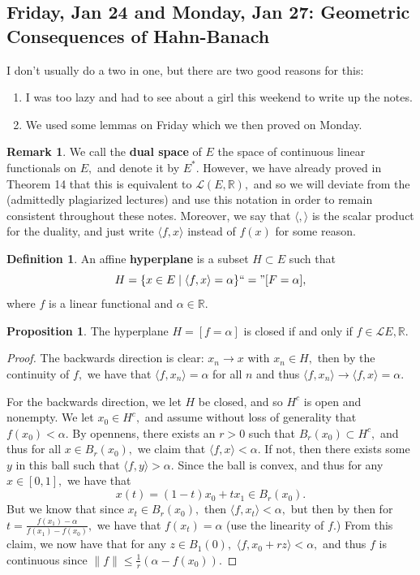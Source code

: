 \documentclass[10pt, oneside]{article}
\newcommand{\bbR}{\mathbb{R}}
\theoremstyle{definition}
\newtheorem{defn}{Definition}
\newtheorem{prop}{Proposition}
\newtheorem{rem}{Remark}
\begin{document}
\subsection{Friday, Jan 24 and Monday, Jan 27: Geometric Consequences of Hahn-Banach}
I don't usually do a two in one, but there are two good reasons for this:
\begin{enumerate}
    \item I was too lazy and had to see about a girl this weekend to write up the notes.
    \item We used some lemmas on Friday which we then proved on Monday.
\end{enumerate}
\begin{rem}
    We call the \textbf{dual space} of $E$ the space of continuous linear functionals on $E,$ and denote it by $E^\ast.$ However, we have already proved in Theorem 14 that this is equivalent to $\mathcal{L}(E, \bbR),$ and so we will deviate from the (admittedly plagiarized lectures) and use this notation in order to remain consistent throughout these notes. Moreover, we say that $\langle , \rangle$ is the scalar product for the duality, and just write $\langle f, x\rangle$ instead of $f(x)$ for some reason.
\end{rem}
\begin{defn}
    An affine \textbf{hyperplane} is a subset $H \subset E$ such that 
    \[H = \{x \in E \; |\; \langle f, x \rangle = \alpha\} ``=" [F = \alpha],\] where $f$ is a linear functional and $\alpha \in \bbR.$
\end{defn}
\begin{prop}
    The hyperplane $H = [f = \alpha]$ is closed if and only if $f \in \mathcal{L}{E, \bbR}.$
\end{prop}
\begin{proof}
    The backwards direction is clear: $x_n \to x$ with $x_n \in H,$ then by the continuity of $f,$ we have that $\langle f, x_n \rangle  = \alpha$ for all $n$ and thus $\langle f, x_n \rangle \to \langle f, x \rangle = \alpha.$

    For the backwards direction, we let $H$ be closed, and so $H^c$ is open and nonempty. We let $x_0 \in H^c,$ and assume without loss of generality that $f(x_0) < \alpha.$  By opennens, there exists an $r>0$ such that $B_{r}(x_0) \subset H^c,$ and thus for all $x\in B_r(x_0),$ we claim that $\langle f, x \rangle < \alpha.$ If not, then there exists some $y$ in this ball such that $\langle f, y \rangle > \alpha.$ Since the ball is convex, and thus for any $x\in [0,1],$ we have that 
    \[x(t) = (1-t)x_0 + tx_1 \in B_r(x_0).\] But we know that since $x_t \in B_r(x_0),$ then $\langle f, x_t \rangle < \alpha,$ but then by then for $t = \frac{f(x_1) - \alpha}{f(x_1) - f(x_0)},$ we have that $f(x_t) = \alpha$ (use the linearity of $f.$) From this claim, we now have that for any $z\in B_1(0),$ $\langle f, x_0 + rz\rangle < \alpha,$ and thus $f$ is continuous since $\|f\| \leq \frac{1}{r}(\alpha - f(x_0)).$
\end{proof}
\end{document}
